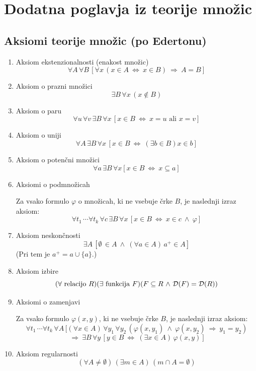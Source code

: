 \documentclass[11pt,paper=b5,footinclude,headinclude]{scrbook} %
\def\inn {{~\wedge~}}
\def\sledi {{~\Rightarrow~}}
\def\cee {{~\Leftrightarrow~}}
\begin{document}
\chapter{Dodatna poglavja iz teorije množic}


\section{Aksiomi teorije množic (po Edertonu)}

\begin{enumerate}
  \item Aksiom ekstenzionalnosti (enakost množic)
  $$\forall A\, \forall B\, [\forall x \,(x\in A \cee x\in B) \sledi A = B]$$
  
  \item Aksiom o prazni množici
  $$\exists B\, \forall x\, (x\not \in B)$$

  \item Aksiom o paru
    $$\forall u\, \forall v\, \exists B\, \forall x\, [x\in B \cee x = u\textrm{ ali }x = v]$$

  \item Aksiom o uniji
    $$\forall A\, \exists B\, \forall x\, [x\in B \cee (\exists b\in B) x\in b]$$

  \item Aksiom o potenčni množici  
    $$\forall a\, \exists B\, \forall x [x\in B \cee x\subseteq a]$$

  \item Aksiomi o podmnožicah
   
  Za vsako formulo $\varphi$ o množicah, ki ne vsebuje črke $B$, 
  je naslednji izraz aksiom:  
$$\forall t_1\,\cdots \forall t_k\,\forall c\,\exists B \,\forall x \,[x\in B \cee x\in c \inn \varphi]$$

  \item Aksiom neskončnosti
$$\exists A\,[\emptyset \,\in A \inn (\forall a\in A)\, a^+\in A]$$
(Pri tem je $a^+ = a\cup \{a\}$.)

\item Aksiom izbire
$$(\forall \textrm{ relacijo }R)(\exists \textrm{ funkcija }F)(F\subseteq R \inn {\cal D}(F) = {\cal D}(R))$$

\item Aksiomi o zamenjavi 

Za vsako formulo $\varphi(x,y)$, ki ne vsebuje črke $B$, 
je naslednji izraz aksiom:
$$\forall t_1\,\cdots \forall t_k\,\forall A\,[(\forall x\in A)\,\forall y_1\, \forall y_2\, (\varphi(x,y_1) \inn \varphi(x,y_2) \sledi y_1 = y_2)$$
$$\sledi \exists B\, \forall y\, [y\in B \cee (\exists x\in A)\,\varphi(x,y)]$$

\item Aksiom regularnosti
$$(\forall A\neq \emptyset)\,(\exists m\in A)\,(m\cap A = \emptyset)$$
\end{enumerate}
\end{document}
